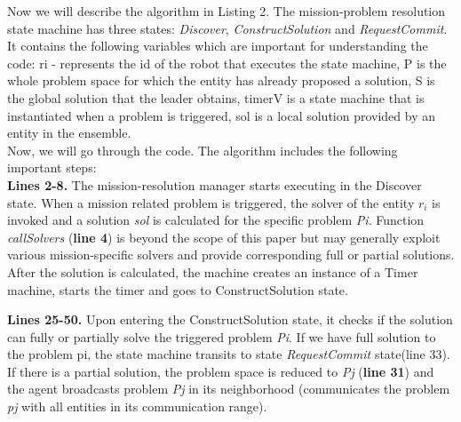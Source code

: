 \documentclass[journal]{IEEEtran}
\theoremstyle{definition}
\begin{document}

 
 
 
 
 
 
Now we will describe the algorithm in Listing 2. 
The mission-problem resolution state machine has three states: \textit{Discover}, \textit{ConstructSolution} and \textit{RequestCommit}. 
It contains the following variables which are important for understanding the code: 
ri - represents the id of the robot that executes the state machine, P is the whole problem space for which the entity has already proposed a solution, S is the global solution that the leader obtains, timerV is a state machine that is instantiated when a problem is triggered, sol is a local solution provided by an entity in the ensemble. \\
Now, we will go through the code.
The algorithm includes the following important steps: \\
\textbf{Lines 2-8.} The mission-resolution manager starts executing in the Discover state. When a mission related problem is triggered, the solver of the entity $r_i$ is invoked and a solution \textit{sol}
is calculated for the specific problem \textit{Pi}. Function \textit{callSolvers} (\textbf{line 4}) 
is beyond the scope of this paper but may generally exploit
various mission-specific solvers and provide corresponding full or partial solutions.  After the solution is calculated, the machine creates an instance of a Timer machine, starts the timer and goes to ConstructSolution state.

\textbf{Lines 25-50.} Upon entering the ConstructSolution state, 
it checks if the solution can fully or partially solve the triggered problem \textit{Pi}. If we have full solution to the problem pi, the state machine transits to state \textit{RequestCommit} state(line 33).
If there is a partial solution, the problem space is reduced to \textit{Pj} (\textbf{line 31}) and  the agent broadcasts problem \textit{Pj} in its neighborhood (communicates the problem \textit{pj} with all entities in its communication range).
\end{document}
